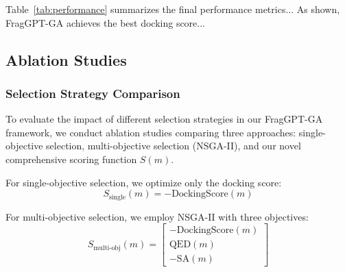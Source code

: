 \documentclass[letterpaper,journal]{IEEEtran}
\begin{document}
        

Table~\ref{tab:performance} summarizes the final performance metrics... As shown, FragGPT-GA achieves the best docking score...
\subsection{Ablation Studies}

\subsubsection{Selection Strategy Comparison}
To evaluate the impact of different selection strategies in our FragGPT-GA framework, we conduct ablation studies comparing three approaches: single-objective selection, multi-objective selection (NSGA-II), and our novel comprehensive scoring function $S(m)$. 

For single-objective selection, we optimize only the docking score:
\begin{equation}
S_{\text{single}}(m) = -\text{DockingScore}(m)
\end{equation}

For multi-objective selection, we employ NSGA-II with three objectives:
\begin{equation}
    S_{\text{multi-obj}}(m) = \begin{bmatrix} -\text{DockingScore}(m) \\ \text{QED}(m) \\ -\text{SA}(m) \end{bmatrix}
\end{equation}
\end{document}
